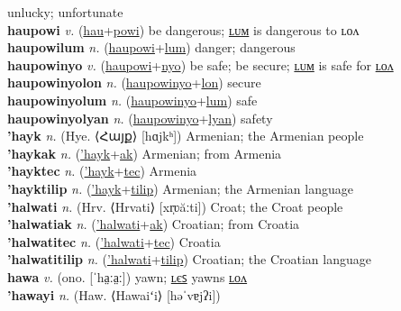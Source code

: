unlucky; unfortunate \label{hautikulon} \\
\textbf{haupowi} \textit{v.} (\hyperref[hau]{hau}+\hyperref[powi]{powi})
be dangerous; \hyperref[haupowilum]{ʟᴜᴍ} is dangerous to ʟᴏᴧ \label{haupowi} \\
\textbf{haupowilum} \textit{n.} (\hyperref[haupowi]{haupowi}+\hyperref[lum]{lum})
danger; dangerous \label{haupowilum} \\
\textbf{haupowinyo} \textit{v.} (\hyperref[haupowi]{haupowi}+\hyperref[nyo]{nyo})
be safe; be secure; \hyperref[haupowinyolum]{ʟᴜᴍ} is safe for \hyperref[haupowinyolon]{ʟᴏᴧ} \label{haupowinyo} \\
\textbf{haupowinyolon} \textit{n.} (\hyperref[haupowinyo]{haupowinyo}+\hyperref[lon]{lon})
secure \label{haupowinyolon} \\
\textbf{haupowinyolum} \textit{n.} (\hyperref[haupowinyo]{haupowinyo}+\hyperref[lum]{lum})
safe \label{haupowinyolum} \\
\textbf{haupowinyolyan} \textit{n.} (\hyperref[haupowinyo]{haupowinyo}+\hyperref[lyan]{lyan})
safety \label{haupowinyolyan} \\
\textbf{'hayk} \textit{n.} (Hye. ⟨Հայք⟩ [hɑjkʰ])
Armenian; the Armenian people \label{'hayk} \\
\textbf{'haykak} \textit{n.} (\hyperref['hayk]{'hayk}+\hyperref[ak]{ak})
Armenian; from Armenia \label{'haykak} \\
\textbf{'hayktec} \textit{n.} (\hyperref['hayk]{'hayk}+\hyperref[tec]{tec})
Armenia \label{'hayktec} \\
\textbf{'hayktilip} \textit{n.} (\hyperref['hayk]{'hayk}+\hyperref[tilip]{tilip})
Armenian; the Armenian language \label{'hayktilip} \\
\textbf{'halwati} \textit{n.} (Hrv. ⟨Hrvati⟩ [xr̩ʋăːti])
Croat; the Croat people \label{'halwati} \\
\textbf{'halwatiak} \textit{n.} (\hyperref['halwati]{'halwati}+\hyperref[ak]{ak})
Croatian; from Croatia \label{'halwatiak} \\
\textbf{'halwatitec} \textit{n.} (\hyperref['halwati]{'halwati}+\hyperref[tec]{tec})
Croatia \label{'halwatitec} \\
\textbf{'halwatitilip} \textit{n.} (\hyperref['halwati]{'halwati}+\hyperref[tilip]{tilip})
Croatian; the Croatian language \label{'halwatitilip} \\
\textbf{hawa} \textit{v.} (ono. [ˈha̤ːa̤ː])
yawn; \hyperref[hawales]{ʟєꜱ} yawns \hyperref[hawalon]{ʟᴏᴧ} \label{hawa} \\
\textbf{'hawayi} \textit{n.} (Haw. ⟨Hawaiʻi⟩ [həˈvɐjʔi])
